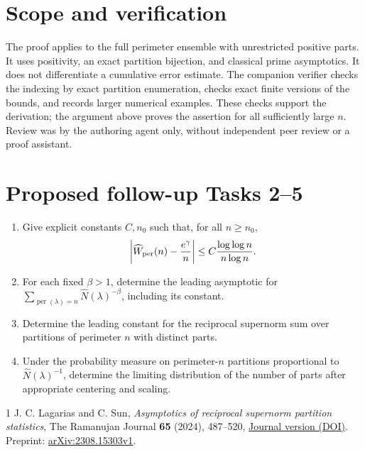 \documentclass[11pt]{article}
\newcommand{\Per}{\operatorname{per}}
\newcommand{\W}{\widehat W_{\rm per}}
\begin{document}
\section*{Scope and verification}
The proof applies to the full perimeter ensemble with unrestricted positive
parts. It uses positivity, an exact partition bijection, and classical prime
asymptotics. It does not differentiate a cumulative error estimate. The
companion verifier checks the indexing by exact partition enumeration,
checks exact finite versions of the bounds, and records larger numerical
examples. These checks support the derivation; the argument above proves
the assertion for all sufficiently large $n$. Review was by the authoring
agent only, without independent peer review or a proof assistant.

\section*{Proposed follow-up Tasks 2--5}
\begin{enumerate}[label=Task \arabic*:,start=2,leftmargin=4.6em]
\item Give explicit constants $C,n_0$ such that, for all $n\ge n_0$,
\[
 \left|\W(n)-\frac{e^\gamma}{n}\right|
 \le C\frac{\log\log n}{n\log n}.
\]
\item For each fixed $\beta>1$, determine the leading asymptotic for
$\sum_{\Per(\lambda)=n}\widehat N(\lambda)^{-\beta}$, including its constant.
\item Determine the leading constant for the reciprocal supernorm sum over
partitions of perimeter $n$ with distinct parts.
\item Under the probability measure on perimeter-$n$ partitions proportional
to $\widehat N(\lambda)^{-1}$, determine the limiting distribution of
the number of parts after appropriate centering and scaling.
\end{enumerate}

\begin{thebibliography}{1}
 J. C. Lagarias and C. Sun,
\emph{Asymptotics of reciprocal supernorm partition statistics},
The Ramanujan Journal \textbf{65} (2024), 487--520,
\href{https://doi.org/10.1007/s11139-024-00893-8}{Journal version (DOI)}.
Preprint: \href{https://arxiv.org/abs/2308.15303}{arXiv:2308.15303v1}.
\end{thebibliography}
\end{document}
